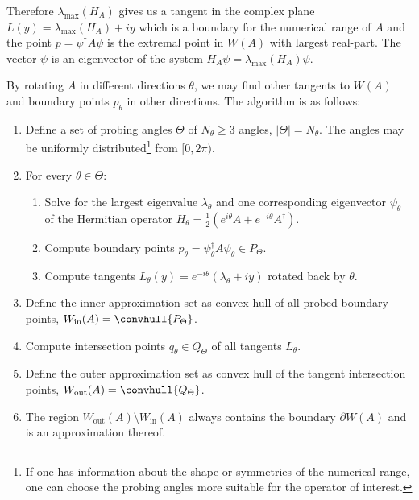 Therefore $\lambda_{\text{max}}(H_A)$ gives us a tangent in the complex plane $L(y) = \lambda_{\text{max}}(H_A) + iy$ which is a boundary for the numerical range of $A$ and the point $p = \psi^{\dagger} A \psi$ is the extremal point in $W(A)$ with largest real-part.
The vector $\psi$ is an eigenvector of the system $H_A \psi = \lambda_{\text{max}}(H_A) \psi$.

By rotating $A$ in different directions $\theta$, we may find other tangents to $W(A)$ and boundary points $p_{\theta}$ in other directions.
The algorithm is as follows:
\begin{enumerate}
\item Define a set of probing angles $\Theta$ of $N_{\theta} \geq 3$ angles, $\lvert \Theta \rvert = N_{\theta}$. The angles may be uniformly distributed\footnote{If one has information about the shape or symmetries of the numerical range, one can choose the probing angles more suitable for the operator of interest.} from $[0, 2 \pi)$.
\item{For every $\theta \in \Theta$:
	\begin{enumerate}
	\item Solve for the largest eigenvalue $\lambda_{\theta}$ and one corresponding eigenvector $\psi_{\theta}$ of the Hermitian operator $H_{\theta} = \frac{1}{2} \left(e^{i \theta} A + e^{-i \theta} A^{\dagger} \right)$.
	\item Compute boundary points $p_{\theta} = \psi_{\theta}^{\dagger} A \psi_{\theta} \in P_{\Theta}$.
	\item Compute tangents $L_{\theta}(y) = e^{-i \theta}(\lambda_{\theta} + iy)$ rotated back by $\theta$.
	\end{enumerate}
}
\item Define the inner approximation set as convex hull of all probed boundary points, $W_{\text{in}}(A) = \convhull{P_{\Theta}}$.
\item Compute intersection points $q_{\theta} \in Q_{\Theta}$ of all tangents $L_{\theta}$.
\item Define the outer approximation set as convex hull of the tangent intersection points,  $W_{\text{out}}(A) = \convhull{Q_{\Theta}}$.
\item The region $W_{\text{out}}(A) \setminus W_{\text{in}}(A)$ always contains the boundary $\partial W(A)$ and is an approximation thereof.
\end{enumerate}

